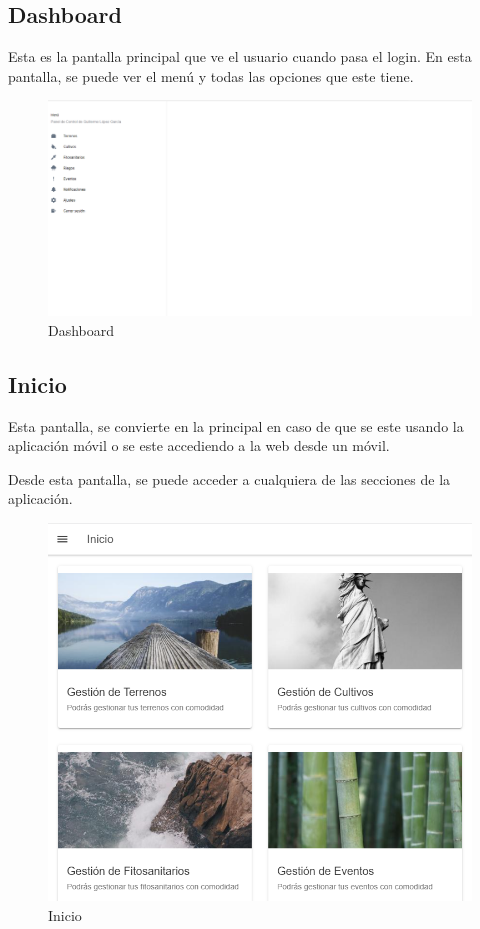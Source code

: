 \subsection{Dashboard}
Esta es la pantalla principal que ve el usuario cuando pasa el login. En esta pantalla, se puede ver el menú y todas las opciones que este tiene.

\begin{figure}[H]
    \centering
    \includegraphics[width=0.7\linewidth]{images/user-manual/dashboard.png}
    \caption{Dashboard}
\end{figure}

\subsection{Inicio}
Esta pantalla, se convierte en la principal en caso de que se este usando la aplicación móvil o se este accediendo a la web desde un móvil.

Desde esta pantalla, se puede acceder a cualquiera de las secciones de la aplicación.

\begin{figure}[H]
    \centering
    \includegraphics[width=0.7\linewidth]{images/user-manual/inicio.png}
    \caption{Inicio}
\end{figure}

